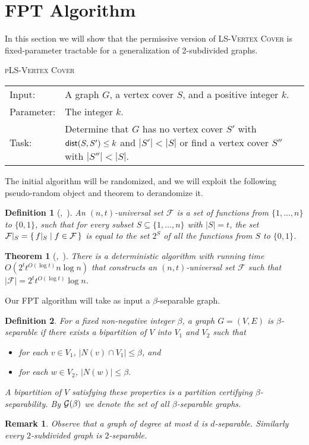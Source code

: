 \documentclass[10pt,usletter]{article}
\newcommand{\SB}{\{\,}\newcommand{\SM}{\;{|}\;}\newcommand{\SE}{\,\}}
\newcommand{\fpt}{fixed-pa\-ra\-me\-ter trac\-ta\-ble\xspace}
\newcommand{\dist}{{\normalfont \textsf{dist}}}
\newcommand{\LSVC}{\textsc{LS-Vertex Cover}\xspace}
\newcommand{\PLSVC}{\textsc{pLS-Vertex Cover}\xspace}
\newcommand{\citey}[1]{\citeauthor{#1},~\citeyear{#1}}
\newtheorem{definition}{Definition}
\newtheorem{theorem}{Theorem}
\newtheorem{remark}{Remark}
\newcommand{\pbDefPtask}[4]{\noindent
\begin{center}
\begin{boxedminipage}{0.98 \columnwidth}
#1\\[5pt]
\begin{tabular}{l p{0.70 \columnwidth}}
Input: & #2\\
Parameter: & #3\\
Task: & #4
\end{tabular}
\end{boxedminipage}
\end{center}
}
\begin{document}
\section{FPT Algorithm}

In this section we will show that the permissive version of \LSVC is \fpt for a generalization of 2-subdivided graphs.

\pbDefPtask{\PLSVC}{A graph $G$, a vertex cover $S$, and a positive integer
  $k$.}{The integer $k$.}
{Determine that $G$ has no vertex cover $S'$ with $\dist(S,S')\leq k$ and $|S'|<|S|$ or find a vertex cover $S''$ with $|S''|<|S|$.}

The initial algorithm will be randomized, and we will exploit the following pseudo-random object and theorem to derandomize it.
\begin{definition}[\citey{NaorSS95}]
An \emph{$(n,t)$-universal set} $\mathcal F$ is a set of functions from
$\{1,\ldots,n\}$ to $\{0,1\}$, such that for every subset $S\subseteq
\{1,\ldots,n\}$ with $|S|=t$, the set 
$\mathcal F|_{S}=\SB f|_S \SM f\in {\cal F}\SE$ 
is equal to the set $2^S$ of all the functions from $S$ to $\{0,1\}$.
\end{definition}

\begin{theorem}[\citey{NaorSS95}]
\label{propuniversalsets}
There is a deterministic algorithm with running time $O(2^t t^{O(\log t)} n\log n)$ that constructs an $(n,t)$-universal set $\mathcal F$ such that $|\mathcal F|=2^t t^{O(\log t)}\log n$.
\end{theorem}

Our FPT algorithm will take as input a $\beta$-separable graph.

\begin{definition}
For a fixed non-negative integer $\beta$, a graph $G=(V,E)$ is \emph{$\beta$-separable}  
if there exists a bipartition of $V$ into $V_1$ and $V_2$ such that
\begin{itemize}
\item for each $v\in V_1$, $|N(v)\cap V_1|\leq \beta$, and
\item for each $w \in V_2$, $|N(w)|\leq \beta$. 
\end{itemize}
A bipartition of $V$ satisfying these properties is a partition \emph{certifying $\beta$-separability}.
By ${\cal G}(\beta)$ we denote the set of all  $\beta$-separable graphs.
\end{definition}
\begin{remark}
{\rm Observe that a graph of degree at most $d$ is $d$-separable. Similarly every $2$-subdivided graph
is $2$-separable.}
\end{remark}
\end{document}
